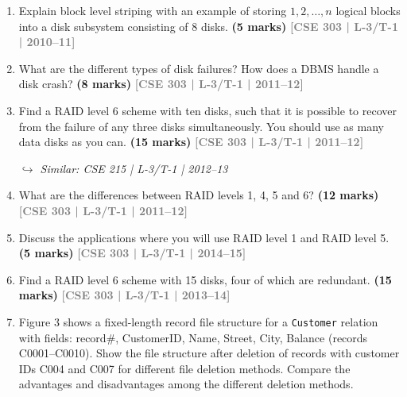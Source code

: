 \documentclass[12pt,a3paper]{article}
\newcommand{\yr}[1]{\hfill\textcolor{gray}{\small\textbf{[#1]}}}
\newcommand{\mk}[1]{\textcolor{orange!70!black}{\small\textbf{(#1 marks)}}}
\newcommand{\variant}[1]{\par\vspace{1pt}\textcolor{blue!50!black}%
  {\footnotesize\textit{$\hookrightarrow$ Similar: #1}}}
\begin{document}
\begin{enumerate}

\item Explain block level striping with an example of storing $1, 2, \ldots, n$ logical blocks into a disk subsystem consisting of 8 disks.
\mk{5} \yr{CSE 303 | L-3/T-1 | 2010--11}

\item What are the different types of disk failures? How does a DBMS handle a disk crash?
\mk{8} \yr{CSE 303 | L-3/T-1 | 2011--12}

\item Find a RAID level 6 scheme with ten disks, such that it is possible to recover from the failure of any three disks simultaneously. You should use as many data disks as you can.
\mk{15} \yr{CSE 303 | L-3/T-1 | 2011--12}

\variant{CSE 215 | L-3/T-1 | 2012--13}

\item What are the differences between RAID levels 1, 4, 5 and 6?
\mk{12} \yr{CSE 303 | L-3/T-1 | 2011--12}

\item Discuss the applications where you will use RAID level 1 and RAID level 5.
\mk{5} \yr{CSE 303 | L-3/T-1 | 2014--15}

\item Find a RAID level 6 scheme with 15 disks, four of which are redundant.
\mk{15} \yr{CSE 303 | L-3/T-1 | 2013--14}

\item Figure 3 shows a fixed-length record file structure for a \texttt{Customer} relation with fields: record\#, CustomerID, Name, Street, City, Balance (records C0001--C0010). Show the file structure after deletion of records with customer IDs C004 and C007 for different file deletion methods. Compare the advantages and disadvantages among the different deletion methods.


\end{enumerate}
\end{document}
